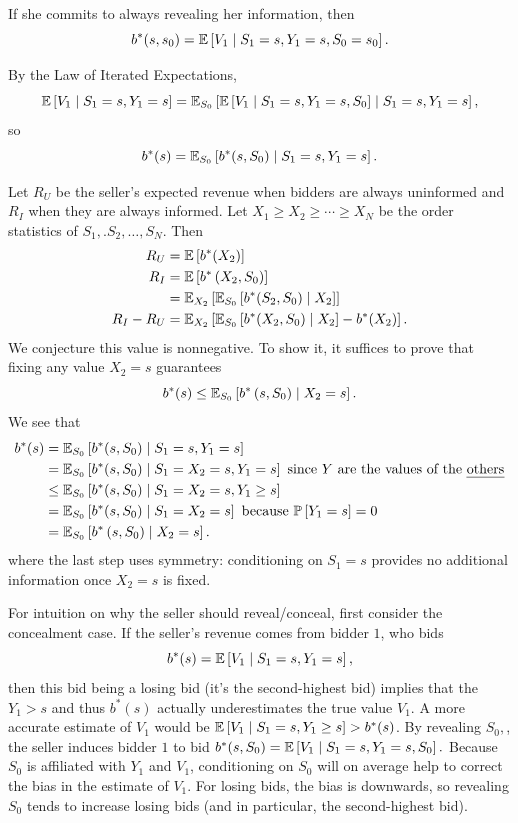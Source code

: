 If she commits to always revealing her information, then
\[
	b^*(s,s_0) = \mathbb{E}\left[V_1 \mid S_1 = s, Y_1 = s, S_0 = s_0\right].
\]

By the Law of Iterated Expectations, \[
	\mathbb{E}\left[V_1 \mid S_1 = s, Y_1 = s\right] = \mathbb{E}_{S_0}\left[\mathbb{E}\left[V_1 \mid S_1 = s, Y_1=s, S_0\right] \mid S_1 = s, Y_1 = s\right] 
,\] so \[
	b^*(s) = \mathbb{E}_{S_0}\left[b^*(s,S_0) \mid S_1 = s, Y_1 = s\right] 
.\] 

Let $R_U$ be the seller's expected revenue when bidders are always uninformed and $R_I$ when they are always informed.
Let $X_1 \ge X_2 \ge \cdots \ge X_N$ be the order statistics of $S_1,.S_2,\ldots,S_N$. Then \begin{align*}
	R_U &= \mathbb{E}\left[b^*(X_2)\right] \\
	R_I &= \mathbb{E}\left[b^*\left( X_2, S_0 \right)\right] \\
		&= \mathbb{E}_{X_2}\left[\mathbb{E}_{S_0}\left[b^*(S_2,S_0) \mid X_2\right]  \right]\\
	R_I - R_U &= \mathbb{E}_{X_2}\left[\mathbb{E}_{S_0}\left[b^*(X_2,S_0) \mid X_2\right] - b^*(X_2)\right] 
.\end{align*} 
We conjecture this value is nonnegative.
To show it, it suffices to prove that fixing any value $X_2 = s$ guarantees \[
	b^*(s) \le \mathbb{E}_{S_0}\left[b^*\left( s,S_0 \right)\mid X_2 = s\right] 
.\] We see that
\begin{align*}
	b^*(s) &=  \mathbb{E}_{S_0}\left[b^*(s,S_0) \mid S_1=s, Y_1=s\right]  \\
		   &= \mathbb{E}_{S_0}\left[b^*(s,S_0) \mid S_1 = X_2 = s, Y_1 = s\right] \text{ since $Y$ are the values of the \emph{others}} \\
		   &\le \mathbb{E}_{S_0}\left[b^*(s,S_0) \mid S_1=X_2=s, Y_1 \ge s\right] \\
		   &= \mathbb{E}_{S_0}\left[b^*(s,S_0) \mid S_1=X_2 =s\right] \text{ because $\mathbb{P}\left[Y_1 = s\right] = 0$} \\
			   &= \mathbb{E}_{S_0}\left[b^*\left( s,S_0 \right)\mid X_2=s\right]
	.\end{align*}
	where the last step uses symmetry: conditioning on $S_1=s$ provides no additional information once $X_2=s$ is fixed.

For intuition on why the seller should reveal/conceal, first consider the concealment case. If the seller's revenue comes from bidder $1$, who bids \[
	b^*(s) = \mathbb{E}\left[V_1 \mid S_1 = s, Y_1 = s\right] 
,\] then this bid being a losing bid (it's the second-highest bid) implies that the $Y_1 > s$ and thus $b^*(s)$ actually underestimates the true value $V_1$.
A more accurate estimate of $V_1$ would be $\mathbb{E}\left[V_1 \mid S_1 = s, Y_1 \ge s\right]  > b^*(s)$.
By revealing $S_0,$, the seller induces bidder $1$ to bid $b^*(s,S_0) = \mathbb{E}\left[V_1\mid S_1= s, Y_1 = s, S_0\right] .$
Because $S_0$ is affiliated with $Y_1$ and $V_1$, conditioning on $S_0$ will on average help to correct the bias in the estimate of $V_1$. For losing bids, the bias is downwards, so revealing $S_0$ tends to increase losing bids (and in particular, the second-highest bid).

